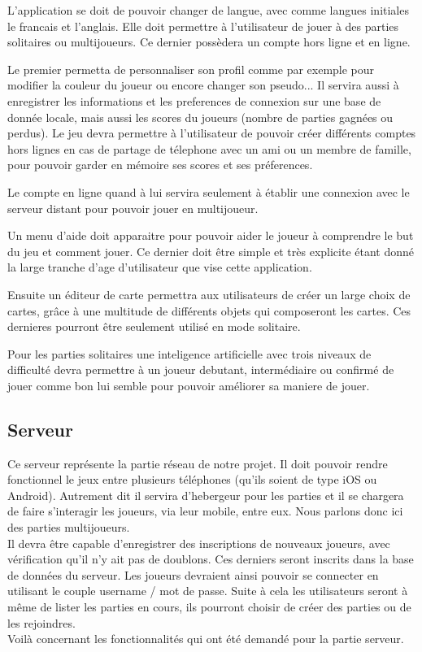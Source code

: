 \documentclass[]{report}
\begin{document}
		L'application se doit de pouvoir changer de langue, avec comme langues initiales le francais et l'anglais. Elle doit permettre à l'utilisateur de jouer à des parties solitaires ou multijoueurs. Ce dernier possèdera un compte hors ligne et en ligne.
		
		Le premier permetta de personnaliser son profil comme par exemple pour modifier la couleur du joueur ou encore changer son pseudo... Il servira aussi à enregistrer les informations et les preferences de connexion sur une base de donnée locale, mais aussi les scores du joueurs (nombre de parties gagnées ou perdus). Le jeu devra permettre à l'utilisateur de pouvoir créer différents comptes hors lignes en cas de partage de télephone avec un ami ou un membre de famille, pour pouvoir garder en mémoire ses scores et ses préferences.
		
		Le compte en ligne quand à lui servira seulement à établir une connexion avec le serveur distant pour pouvoir jouer en multijoueur.
		
		Un menu d'aide doit apparaitre pour pouvoir aider le joueur à comprendre le but du jeu et comment jouer. Ce dernier doit être simple et très explicite étant donné la large tranche d'age d'utilisateur que vise cette application.
		
		Ensuite un éditeur de carte permettra aux utilisateurs de créer un large choix de cartes, grâce à une multitude de différents objets qui composeront les cartes. Ces dernieres pourront être seulement utilisé en mode solitaire.
		
		Pour les parties solitaires une inteligence artificielle avec trois niveaux de difficulté devra permettre à un joueur debutant, intermédiaire ou confirmé de jouer comme bon lui semble pour pouvoir améliorer sa maniere de jouer.
		
		\subsection{Serveur}
		
		Ce serveur représente la partie réseau de notre projet. Il doit pouvoir
		rendre fonctionnel le jeux entre plusieurs téléphones (qu'ils soient de type
		iOS ou Android). Autrement dit il servira d'hebergeur pour les parties et
		il se chargera de faire s'interagir les joueurs, via leur mobile, entre eux.
		Nous parlons donc ici des parties multijoueurs.\\ 
		Il devra être capable d'enregistrer des inscriptions de nouveaux joueurs, avec
		 vérification qu'il n'y ait pas de doublons. Ces derniers seront inscrits dans la base de données du serveur. Les joueurs devraient ainsi
		pouvoir se connecter en utilisant le couple username / mot de passe. Suite à
		cela les utilisateurs seront à même de lister les parties en cours, ils
		pourront choisir de créer des parties ou de les rejoindres.\\
		Voilà concernant les fonctionnalités qui ont été demandé pour la partie
		serveur.
	
\end{document}
